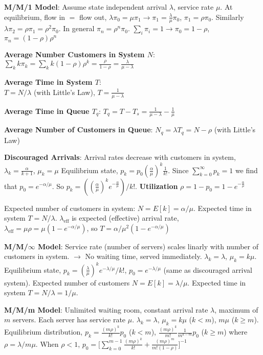 \documentclass{scrartcl}
\begin{document}
\begin{multicols*}{3}
{\bf M/M/1 Model}: Assume state independent arrival $\lambda$, service rate $\mu$. At equilibrium, flow in $=$ flow out, $\lambda\pi_0=\mu\pi_1\to\pi_1=\frac{\lambda}{\mu}\pi_0$, $\pi_1=\rho\pi_0$. Similarly $\lambda\pi_2=\rho\pi_1=\rho^2\pi_0$. In general $\pi_n=\rho^n\pi_0$. $\sum_i\pi_i=1\to\pi_0=1-\rho$, $\pi_n=(1-\rho)\rho^n$

{\bf Average Number Customers in System $N$}: $\sum_kk\pi_k=\sum_kk(1-\rho)\rho^k=\frac{\rho}{1-\rho}=\frac{\lambda}{\mu-\lambda}$

{\bf Average Time in System $T$}: \\
$T=N/\lambda$ (with Little's Law), $T=\frac{1}{\mu-\lambda}$

{\bf Average Time in Queue $T_q$}: $T_q=T-T_s=\frac{1}{\mu-\lambda}-\frac{1}{\mu}$

{\bf Average Number of Customers in Queue}: $N_q=\lambda T_q=N-\rho$ (with Little's Law)

{\bf Discouraged Arrivals}: Arrival rates decrease with customers in system, $\lambda_k=\frac{\alpha}{k+1}$, $\mu_k=\mu$ Equilibrium state, $p_k=p_0(\frac{\alpha}{\mu})^k\frac{1}{k!}$. Since $\sum_{k=0}^\infty p_k=1$ we find that $p_0=e^{-\alpha/\mu}$. So $p_k=((\frac{\alpha}{\mu})^ke^{-\frac{\alpha}{\mu}})/k!$. {\bf Utilization} $\rho=1-p_0=1-e^{-\frac{\alpha}{\mu}}$

Expected number of customers in system: $N=E[k]=\alpha/\mu$. Expected time in system $T=N/\lambda$. $\lambda_{\text{eff}}$ is expected (effective) arrival rate, $\lambda_{\text{eff}}=\mu\rho=\mu(1-e^{-\alpha/\mu})$, so $T=\alpha/\mu^2(1-e^{-\alpha/\mu})$


{\bf M/M/$\infty$ Model}: Service rate (number of servers) scales linarly with number of customers in system. $\to$ No waiting time, served immediately. $\lambda_k=\lambda$, $\mu_k=k\mu$. Equilibrium state, $p_k=(\frac{\lambda}{\mu})^ke^{-\lambda/\mu}/k!$, $p_0=e^{-\lambda/\mu}$ (same as discouraged arrival system). Expected number of customers $N=E[k]=\lambda/\mu$. Expected time in system $T=N/\lambda=1/\mu$.


{\bf M/M/m Model}: Unlimited waiting room, constant arrival rate $\lambda$, maximum of $m$ servers. Each server has service rate $\mu$. $\lambda_k=\lambda$, $\mu_k=k\mu$ ($k<m$), $m\mu$ ($k\geq m$). Equilibrium distribution, $p_k=\frac{(m\rho)^k}{k!}p_0$ ($k<m$), $\frac{(m\rho)^k}{m!}\frac{1}{m^{k-m}}p_0$ ($k\geq m$) where $\rho=\lambda/m\mu$. When $\rho<1$, $p_0=\Big[\sum_{k=0}^{m-1}\frac{(m\rho)^k}{k!}+\frac{(m\rho)^m}{m!(1-\rho)}\Big]^{-1}$



\end{multicols*}
\end{document}
